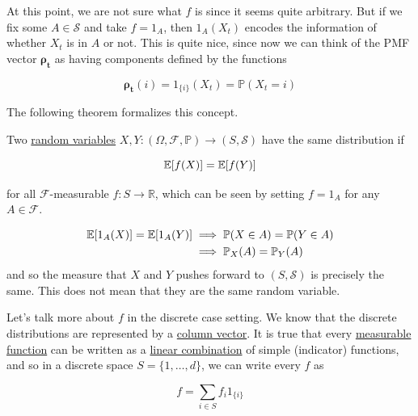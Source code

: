     At this point, we are not sure what $f$ is since it seems quite arbitrary. But if we fix some $A \in \mathcal{S}$ and take $f = 1_A$, then $1_A (X_t)$ encodes the information of whether $X_t$ is in $A$ or not. This is quite nice, since now we can think of the PMF vector $\boldsymbol{\rho_t}$ as having components defined by the functions 

      \begin{equation}
        \boldsymbol{\rho_t} (i) = 1_{\{i\}} (X_t) = \mathbb{P}(X_t = i)
      \end{equation}

    The following theorem formalizes this concept. 

    \begin{theorem}
      \label{thm:equality-of-distributions-via-expectations}
      Two \hyperref[prob-def:random-variable]{random variables} $X, Y : (\Omega, \mathcal{F}, \mathbb{P}) \rightarrow (S, \mathcal{S})$ have the same distribution if 

        \begin{equation}
          \operatorname{\mathbb{E}}[f(X)] = \operatorname{\mathbb{E}}[f(Y)]
        \end{equation}

      for all $\mathcal{F}$-measurable $f: S \rightarrow \mathbb{R}$, which can be seen by setting $f = 1_A$ for any $A \in \mathcal{F}$. 

      \begin{align*}
        \operatorname{\mathbb{E}}[1_A (X)] = \operatorname{\mathbb{E}}[1_A (Y)] & \implies \mathbb{P}(X \in A) = \mathbb{P}(Y \in A) \\
        & \implies \mathbb{P}_X (A) = \mathbb{P}_Y (A)
      \end{align*}
      and so the measure that $X$ and $Y$ pushes forward to $(S, \mathcal{S})$ is precisely the same. This does not mean that they are the same random variable. 
    \end{theorem}

    Let's talk more about $f$ in the discrete case setting. We know that the discrete distributions are represented by a \hyperref[lin-def:column-vector]{column vector}. It is true that every \hyperref[mt-def:measurable-function]{measurable function} can be written as a \hyperref[lin-def:linear-combination]{linear combination} of simple (indicator) functions, and so in a discrete space $S = \{1, \ldots, d\}$, we can write every $f$ as 

      \begin{equation}
        f = \sum_{i \in S} f_i 1_{\{i\}}
      \end{equation}

